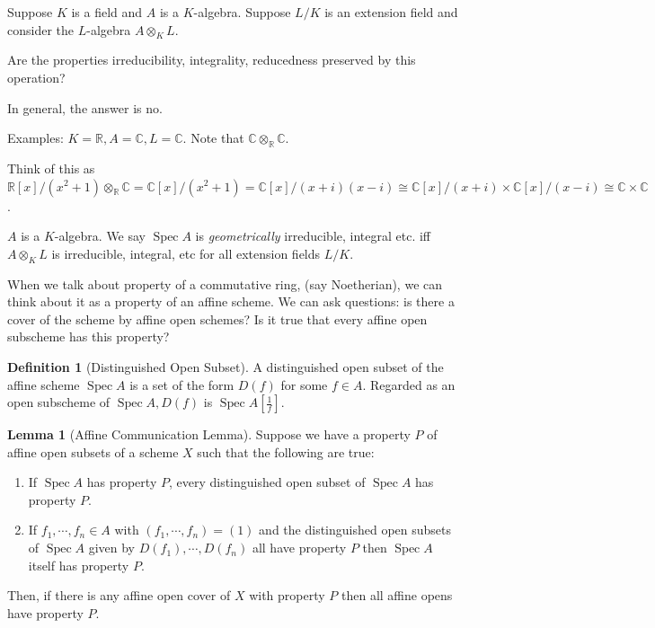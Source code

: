 \documentclass{article}
\theoremstyle{definition}
\newtheorem*{definition}{Definition}
\newtheorem{lemma}[theorem]{Lemma}
\begin{document}
    Suppose \(K\) is a field and \(A\) is a \(K\)-algebra. Suppose \(L / K\) is an extension field and consider the \(L\)-algebra \(A \otimes_K L\).

    Are the properties irreducibility, integrality, reducedness preserved by this operation?

    In general, the answer is no.

    Examples: \(K=\mathbb{R}, A=\mathbb{C}, L=\mathbb{C}\). Note that \(\mathbb{C}\otimes_{\mathbb{R}} \mathbb{C}\).

    Think of this as \(\mathbb{R}[x] / (x^2 + 1) \otimes_{\mathbb{R}} \mathbb{C}  = \mathbb{C} [x] / (x^2 + 1) = \mathbb{C} [x] / (x+i)(x-i) \cong \mathbb{C} [x] / (x+i) \times \mathbb{C} [x] / (x-i) \cong \mathbb{C} \times \mathbb{C}\). 

    \(A\) is a \(K\)-algebra. We say \(\operatorname{Spec} A\) is \textit{geometrically} irreducible, integral etc. iff \(A \otimes_K L\) is irreducible, integral, etc for all extension fields \(L / K\).

    When we talk about property of a commutative ring, (say Noetherian), we can think about it as a property of an affine scheme. We can ask questions: is there a cover of the scheme by affine open schemes? Is it true that every affine open subscheme has this property?

    \begin{definition}
        [Distinguished Open Subset] A distinguished open subset of the affine scheme \(\operatorname{Spec} A\) is a set of the form \(D(f)\) for some \(f\in A\). Regarded as an open subscheme of \(\operatorname{Spec} A, D(f)\) is \(\operatorname{Spec} A \left[ \frac{1}{f} \right] \).
    \end{definition}

    \begin{lemma}
        [Affine Communication Lemma] Suppose we have a property \(P\) of affine open subsets of a scheme \(X\) such that the following are true:

        \begin{enumerate}[label=\arabic*)]
            \item If \(\operatorname{Spec} A\) has property \(P\), every distinguished open subset of \(\operatorname{Spec} A\) has property \(P\).
            \item If \(f_1, \cdots , f_n \in A\) with \((f_1, \cdots , f_n) = (1)\) and the distinguished open subsets of \(\operatorname{Spec} A\) given by \(D(f_1), \cdots , D(f_n)\) all have property \(P\) then \(\operatorname{Spec} A\) itself has property \(P\).  
        \end{enumerate} 

        Then, if there is any affine open cover of \(X\) with property \(P\) then all affine opens have property \(P\).
    \end{lemma}
\end{document}
